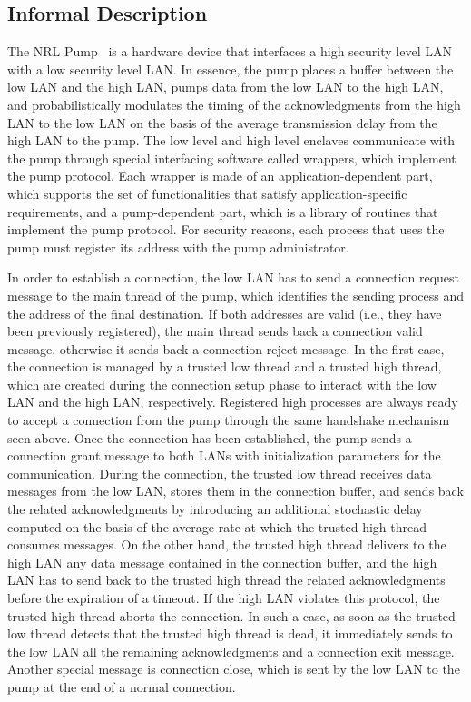 \subsection{Informal Description}

The NRL Pump~\cite{KMM} is a hardware device that interfaces a high security level LAN with a low security
level LAN. In essence, the pump places a buffer between the low LAN and the high LAN, pumps data from the
low LAN to the high LAN, and probabilistically modulates the timing of the acknowledgments from the high LAN
to the low LAN on the basis of the average transmission delay from the high LAN to the pump. The low level
and high level enclaves communicate with the pump through special interfacing software called wrappers,
which implement the pump protocol. Each wrapper is made of an application-dependent part, which supports the
set of functionalities that satisfy application-specific requirements, and a pump-dependent part, which is a
library of routines that implement the pump protocol. For security reasons, each process that uses the pump
must register its address with the pump administrator.

In order to establish a connection, the low LAN has to send a connection request message to the main thread
of the pump, which identifies the sending process and the address of the final destination. If both
addresses are valid (i.e., they have been previously registered), the main thread sends back a connection
valid message, otherwise it sends back a connection reject message. In the first case, the connection is
managed by a trusted low thread and a trusted high thread, which are created during the connection setup
phase to interact with the low LAN and the high LAN, respectively. Registered high processes are always
ready to accept a connection from the pump through the same handshake mechanism seen above. Once the
connection has been established, the pump sends a connection grant message to both LANs with initialization
parameters for the communication. During the connection, the trusted low thread receives data messages from
the low LAN, stores them in the connection buffer, and sends back the related acknowledgments by introducing
an additional stochastic delay computed on the basis of the average rate at which the trusted high thread
consumes messages. On the other hand, the trusted high thread delivers to the high LAN any data message
contained in the connection buffer, and the high LAN has to send back to the trusted high thread the related
acknowledgments before the expiration of a timeout. If the high LAN violates this protocol, the trusted high
thread aborts the connection. In such a case, as soon as the trusted low thread detects that the trusted
high thread is dead, it immediately sends to the low LAN all the remaining acknowledgments and a connection
exit message. Another special message is connection close, which is sent by the low LAN to the pump at the
end of a normal connection.


